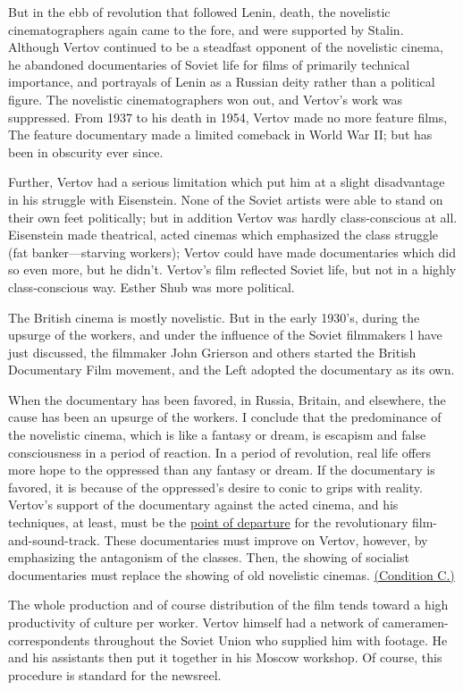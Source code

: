 But in the ebb of revolution that followed Lenin, death, the novelistic 
cinematographers again came to the fore, and were supported by Stalin.
Although Vertov continued to be a steadfast opponent
of the novelistic cinema, he abandoned documentaries of
Soviet life for films of primarily technical importance, and portrayals
of Lenin as a Russian deity rather than a political figure.
The novelistic cinematographers won out, and Vertov's work was 
suppressed. From 1937 to his death in 1954, Vertov made no 
more feature films, The feature documentary made a limited comeback
in World War II; but has been in obscurity ever since. 

Further, Vertov had a serious limitation which put him at a slight disadvantage in his struggle with Eisenstein. None of the Soviet artists were able to stand on their own feet politically; but in addition Vertov was hardly class-conscious at all. Eisenstein made theatrical, acted cinemas which emphasized the class struggle (fat banker---starving workers); Vertov could have made documentaries which did so even more, but he didn't. Vertov's film reflected Soviet life, but not in a highly class-conscious way. Esther Shub was more political. 

The British cinema is mostly novelistic. But in the early 1930's, during the upsurge of the workers, and under the influence of the Soviet filmmakers l have just discussed, the filmmaker John Grierson and others started the British Documentary Film movement, and the Left adopted the documentary as its own. 

When the documentary has been favored, in Russia, Britain, and elsewhere, the cause has been an upsurge of the workers. I conclude that the predominance of the novelistic cinema, which is like a fantasy or dream, is escapism and false consciousness in a period of reaction. In a period of revolution, real life offers more hope to the oppressed than any fantasy or dream. If the documentary is favored, it is because of the oppressed's desire to conic to grips with reality. Vertov's support of the documentary against the acted cinema, and his techniques, at least, must be the \uline{point of departure} for the revolutionary film-and-sound-track. These documentaries must improve on Vertov, however, by emphasizing the antagonism of the classes. Then, the showing of socialist documentaries must replace the showing of old novelistic cinemas. \uline{(Condition C.)}

The whole production and of course distribution of the film tends toward a high productivity of culture per worker. Vertov himself had a network of cameramen-correspondents throughout the Soviet Union who supplied him with footage. He and his assistants then put it together in his Moscow workshop. Of course, this procedure is standard for the newsreel. 

